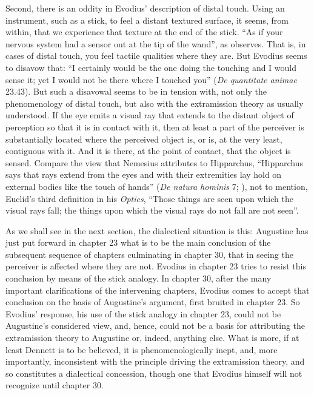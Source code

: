 \documentclass[12pt]{article}
\begin{document}
Second, there is an oddity in Evodius' description of distal touch. Using an instrument, such as a stick, to feel a distant textured surface, it seems, from within, that we experience that texture at the end of the stick. ``As if your nervous system had a sensor out at the tip of the wand'', as \citet[47]{Dennett:1993ce} observes. That is, in cases of distal touch, you feel tactile qualities where they are. But Evodius seems to disavow that: ``I certainly would be the one doing the touching and I would sense it; yet I would not be there where I touched you'' (\emph{De quantitate animae} 23.43). But such a disavowal seems to be in tension with, not only the phenomenology of distal touch, but also with the extramission theory as usually understood. If the eye emits a visual ray that extends to the distant object of perception so that it is in contact with it, then at least a part of the perceiver is substantially located where the perceived object is, or is, at the very least, contiguous with it. And it is there, at the point of contact, that the object is sensed. Compare the view that Nemesius attributes to Hipparchus, ``Hipparchus says that rays extend from the eyes and with their extremities lay hold on external bodies like the touch of hands'' (\emph{De natura hominis} 7; \citealt[104]{Sharples:2008aa}), not to mention, Euclid's third definition in his \emph{Optics}, ``Those things are seen upon which the visual rays fall; the things upon which the visual rays do not fall are not seen''.

As we shall see in the next section, the dialectical situation is this: Augustine has just put forward in chapter 23 what is to be the main conclusion of the subsequent sequence of chapters culminating in chapter 30, that in seeing the perceiver is affected where they are not. Evodius in chapter 23 tries to resist this conclusion by means of the stick analogy. In chapter 30, after the many important clarifications of the intervening chapters, Evodius comes to accept that conclusion on the basis of Augustine's argument, first bruited in chapter 23. So Evodius' response, his use of the stick analogy in chapter 23, could not be Augustine's considered view, and, hence, could not be a basis for attributing the extramission theory to Augustine or, indeed, anything else. What is more, if at least Dennett is to be believed, it is phenomenologically inept, and, more importantly, inconsistent with the principle driving the extramission theory, and so constitutes a dialectical concession, though one that Evodius himself will not recognize until chapter 30.
\end{document}
